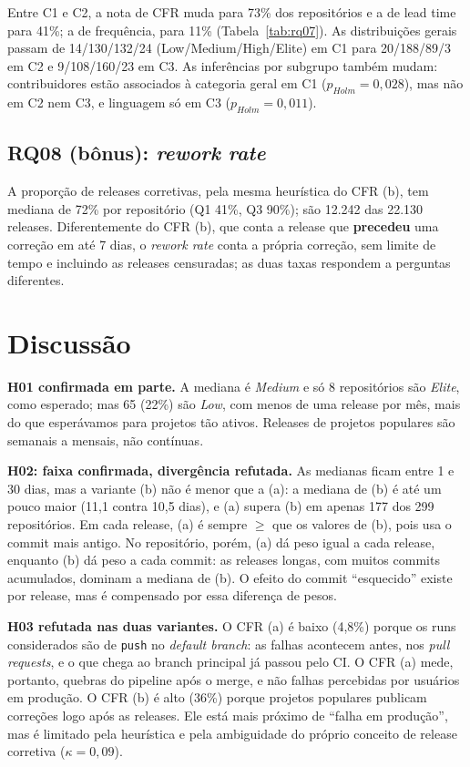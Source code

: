 \documentclass[12pt]{article}
\begin{document}
Entre C1 e C2, a nota de CFR muda para 73\% dos repositórios e a de lead time para 41\%; a de frequência, para 11\% (Tabela~\ref{tab:rq07}). As distribuições gerais passam de 14/130/132/24 (Low/Medium/High/Elite) em C1 para 20/188/89/3 em C2 e 9/108/160/23 em C3. As inferências por subgrupo também mudam: contribuidores estão associados à categoria geral em C1 ($p_{Holm} = 0{,}028$), mas não em C2 nem C3, e linguagem só em C3 ($p_{Holm} = 0{,}011$).

\subsection{RQ08 (bônus): \textit{rework rate}}

A proporção de releases corretivas, pela mesma heurística do CFR (b), tem mediana de 72\% por repositório (Q1 41\%, Q3 90\%); são 12.242 das 22.130 releases. Diferentemente do CFR (b), que conta a release que \textbf{precedeu} uma correção em até 7 dias, o \textit{rework rate} conta a própria correção, sem limite de tempo e incluindo as releases censuradas; as duas taxas respondem a perguntas diferentes.

\section{Discussão}

\textbf{H01 confirmada em parte.} A mediana é \textit{Medium} e só 8 repositórios são \textit{Elite}, como esperado; mas 65 (22\%) são \textit{Low}, com menos de uma release por mês, mais do que esperávamos para projetos tão ativos. Releases de projetos populares são semanais a mensais, não contínuas.

\textbf{H02: faixa confirmada, divergência refutada.} As medianas ficam entre 1 e 30 dias, mas a variante (b) não é menor que a (a): a mediana de (b) é até um pouco maior (11,1 contra 10,5 dias), e (a) supera (b) em apenas 177 dos 299 repositórios. Em cada release, (a) é sempre $\ge$ que os valores de (b), pois usa o commit mais antigo. No repositório, porém, (a) dá peso igual a cada release, enquanto (b) dá peso a cada commit: as releases longas, com muitos commits acumulados, dominam a mediana de (b). O efeito do commit ``esquecido'' existe por release, mas é compensado por essa diferença de pesos.

\textbf{H03 refutada nas duas variantes.} O CFR (a) é baixo (4,8\%) porque os runs considerados são de \texttt{push} no \textit{default branch}: as falhas acontecem antes, nos \textit{pull requests}, e o que chega ao branch principal já passou pelo CI. O CFR (a) mede, portanto, quebras do pipeline após o merge, e não falhas percebidas por usuários em produção. O CFR (b) é alto (36\%) porque projetos populares publicam correções logo após as releases. Ele está mais próximo de ``falha em produção'', mas é limitado pela heurística e pela ambiguidade do próprio conceito de release corretiva ($\kappa = 0{,}09$).
\end{document}
